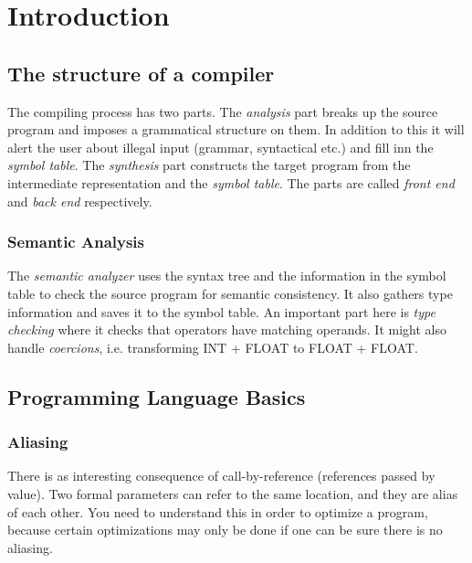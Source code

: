 \documentclass{article}
\begin{document}
\section{Introduction} %
\label{sec:Introduction}

\subsection{The structure of a compiler} %
\label{sub:The structure of a compiler}
The compiling process has two parts.
The \emph{analysis} part breaks up the source program and imposes a grammatical structure on them. In addition to this it will alert the user about illegal input (grammar, syntactical etc.) and fill inn the \emph{symbol table}.
The \emph{synthesis} part constructs the target program from the intermediate representation and the \emph{symbol table}.
The parts are called \emph{front end} and \emph{back end} respectively.
\subsubsection{Semantic Analysis} %
\label{ssub:Semantic Analysis}
The \emph{semantic analyzer} uses the syntax tree and the information in the symbol table to check the source program for semantic consistency. It also gathers type information and saves it to the symbol table. An important part here is \emph{type checking} where it checks that operators have matching operands. It might also handle \emph{coercions}, i.e. transforming INT + FLOAT to FLOAT + FLOAT.

\subsection{Programming Language Basics} %
\label{sub:Programming Language Basics}
\subsubsection{Aliasing} %
\label{ssub:Aliasing}
There is as interesting consequence of call-by-reference (references passed by value). Two formal parameters can refer to the same location, and they are alias of each other. You need to understand this in order to optimize a program, because certain optimizations may only be done if one can be sure there is no aliasing.
\end{document}
